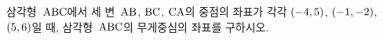 삼각형~$\mathrm{ABC}$에서 세 변~$\mathrm{AB}$, $\mathrm{BC}$, $\mathrm{CA}$의 중점의 좌표가 각각 $(-4{,}\mkern3mu\mathopen{}5)$, $(-1{,}\mkern3mu\mathopen{}-2)$, $(5{,}\mkern3mu\mathopen{}6)$일 때, 삼각형~$\mathrm{ABC}$의 무게중심의 좌표를 구하시오.
